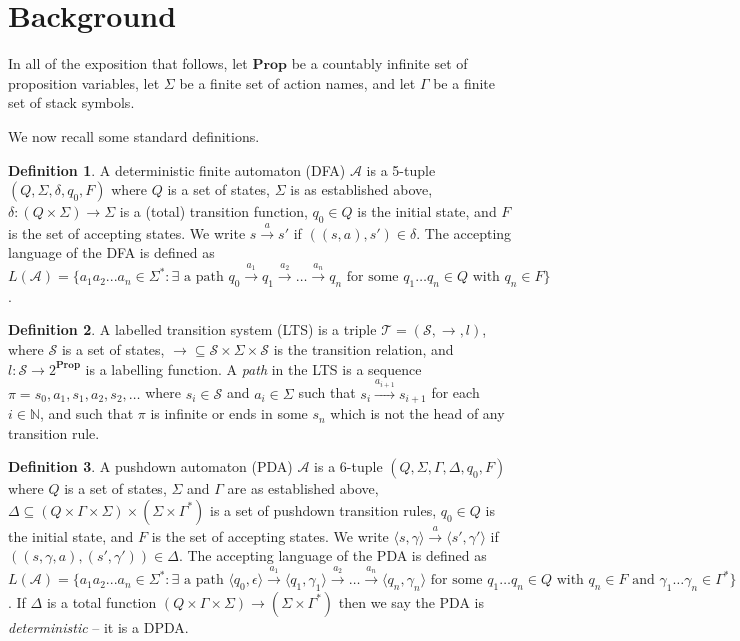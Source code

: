 \documentclass[11pt]{article}
\theoremstyle{definition}
\newtheorem{mydef}{Definition}
\begin{document}
\section{Background}

In all of the exposition that follows, let $\textbf{Prop}$ be a countably
infinite set of proposition variables, let $\Sigma$ be a finite set of action
names, and let $\Gamma$ be a finite set of stack symbols.

We now recall some standard definitions.

\begin{mydef}
A deterministic finite automaton (DFA) $\mathcal{A}$ is a 5-tuple $(Q, \Sigma, \delta, q_0, F)$ where
$Q$ is a set of states, $\Sigma$ is as established above,
$\delta : (Q \times \Sigma) \rightarrow \Sigma $ is a (total) transition function, $q_0 \in Q$ is the initial state, and
$F$ is the set of accepting states. We write $ s \xrightarrow{a} s'$ if $((s, a), s') \in \delta$.
The accepting language of the DFA is defined as $L(\mathcal{A}) = \{ a_1 a_2
... a_n \in \Sigma^* : \exists\text{ a path } q_0 \xrightarrow{a_1} q_1
\xrightarrow{a_2} \dots \xrightarrow{a_n}
 q_n \text{ for some } q_1 \dots q_n
\in Q \text{ with } q_n \in F
\}$.
\end{mydef}

\begin{mydef}
A labelled transition system (LTS) is a triple $\mathcal{T} = (\mathcal{S},
\rightarrow, l)$,
where $\mathcal{S}$ is a set of states, $\rightarrow \subseteq \mathcal{S} \times
\Sigma \times \mathcal{S}$ is the transition relation, and $l:\mathcal{S}
\rightarrow 2^{\textbf{Prop}}$ is a labelling function.
A \textit{path} in the LTS is a sequence $\pi = s_0, a_1, s_1, a_2, s_2, \dots$
where $s_i \in \mathcal{S}$ and $a_i \in \Sigma$ such that $s_i
\xrightarrow{a_{i+1}} s_{i+1} $ for each $i \in \mathbb{N}$, and such that
$\pi$ is infinite or ends in some $s_n$ which is not the head of any transition
rule. 
\end{mydef}

\begin{mydef}
A pushdown automaton (PDA) $\mathcal{A}$ is a 6-tuple $(Q, \Sigma, \Gamma,
\Delta, q_0, F)$ where
$Q$ is a set of states, $\Sigma$ and $\Gamma$ are as established above,
$\Delta \subseteq (Q \times \Gamma \times \Sigma) \times (\Sigma \times
\Gamma^*)$ is a set of pushdown transition rules, $q_0 \in Q$ is the initial
state, and
$F$ is the set of accepting states. We write $\langle s, \gamma \rangle
\xrightarrow{a} \langle s', \gamma' \rangle$ if $((s, \gamma, a), (s',
\gamma')) \in \Delta$.
The accepting language of the PDA is defined as $L(\mathcal{A}) = \{ a_1 a_2
... a_n \in \Sigma^* : \exists\text{ a path }\langle q_0, \epsilon \rangle \xrightarrow{a_1} \langle q_1, \gamma_1 \rangle
\xrightarrow{a_2} \dots \xrightarrow{a_n}
\langle q_n, \gamma_n \rangle \text{ for some } q_1 \dots q_n
\in Q \text{ with } q_n \in F
\text{ and } \gamma_1 \dots \gamma_n \in \Gamma^*
\}$. If $\Delta$ is a total function $(Q \times \Gamma \times \Sigma) \rightarrow (\Sigma \times \Gamma^*)$ then we say the PDA is \textit{deterministic} -- it is a DPDA.
\end{mydef}
\end{document}
